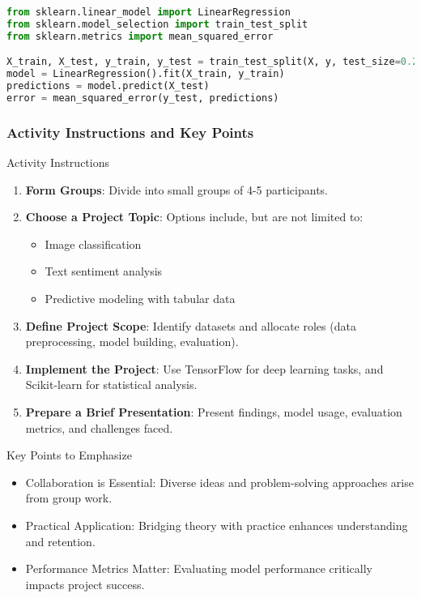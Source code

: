 \documentclass[aspectratio=169]{beamer}
\begin{document}
\begin{frame}[fragile]
\begin{itemize}
        \begin{lstlisting}[language=Python]
from sklearn.linear_model import LinearRegression
from sklearn.model_selection import train_test_split
from sklearn.metrics import mean_squared_error

X_train, X_test, y_train, y_test = train_test_split(X, y, test_size=0.2)
model = LinearRegression().fit(X_train, y_train)
predictions = model.predict(X_test)
error = mean_squared_error(y_test, predictions)
        \end{lstlisting}
    \end{itemize}
\end{frame}

\begin{frame}
    \frametitle{Activity Instructions and Key Points}
    \begin{block}{Activity Instructions}
        \begin{enumerate}
            \item \textbf{Form Groups}: Divide into small groups of 4-5 participants.
            \item \textbf{Choose a Project Topic}: Options include, but are not limited to:
                \begin{itemize}
                    \item Image classification
                    \item Text sentiment analysis
                    \item Predictive modeling with tabular data
                \end{itemize}
            \item \textbf{Define Project Scope}: Identify datasets and allocate roles (data preprocessing, model building, evaluation).
            \item \textbf{Implement the Project}: Use TensorFlow for deep learning tasks, and Scikit-learn for statistical analysis.
            \item \textbf{Prepare a Brief Presentation}: Present findings, model usage, evaluation metrics, and challenges faced.
        \end{enumerate}
    \end{block}

    \begin{block}{Key Points to Emphasize}
        \begin{itemize}
            \item Collaboration is Essential: Diverse ideas and problem-solving approaches arise from group work.
            \item Practical Application: Bridging theory with practice enhances understanding and retention.
            \item Performance Metrics Matter: Evaluating model performance critically impacts project success.
        \end{itemize}
    \end{block}
\end{frame}
\end{document}
